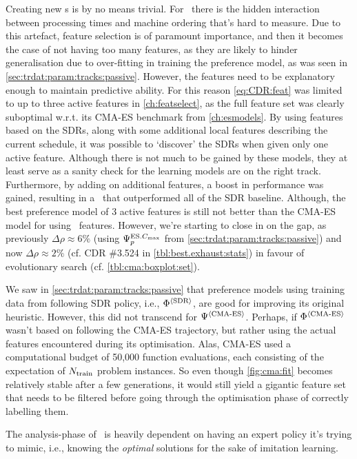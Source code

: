Creating new \dr s is by no means trivial. For \jsp\ there is 
the hidden interaction between processing times and machine ordering that's 
hard to measure.
Due to this artefact, feature selection is of paramount importance, and then it 
becomes the case of not having too many features, as they are likely to hinder 
generalisation due to over-fitting in training the preference model, as was 
seen in \cref{sec:trdat:param:tracks:passive}. 
However, the features need to be explanatory enough to maintain predictive 
ability. 
For this reason \cref{eq:CDR:feat} was limited to up to three active features 
in \cref{ch:featselect}, as the full feature set was clearly suboptimal 
w.r.t. its CMA-ES benchmark from \cref{ch:esmodels}. 
By using features based on the SDRs, along with some additional local features 
describing the current schedule, it was possible to `discover' the SDRs when 
given only one active feature. 
Although there is not much to be gained by these models, they at least serve as 
a sanity check for the learning models are on the right track. 
Furthermore, by adding on additional features, a boost in performance was 
gained, resulting in a \cdr\ that outperformed all of the SDR baseline. 
Although, the best preference model of 3 active features is still not better 
than the CMA-ES model for  using \NrFeatLocal\ features. 
However, we're starting to close in on the gap, as previously 
$\Delta\rho\approx6\%$ (using $\Psi_p^{\text{ES}.{C_{\max}}}$ from 
\cref{sec:trdat:param:tracks:passive}) and now $\Delta\rho\approx2\%$ (cf. 
CDR \#3.524 in \cref{tbl:best.exhaust:stats}) in favour of evolutionary 
search (cf. \cref{tbl:cma:boxplot:set}).



We saw in \cref{sec:trdat:param:tracks:passive} that preference models using 
training data from following SDR policy, i.e., $\Phi^{\langle \text{SDR} \rangle}$, are good for 
improving its original heuristic. However, this did not transcend for 
$\Psi^{\langle \text{CMA-ES} \rangle}$. 
Perhaps, if $\Phi^{\langle \text{CMA-ES} \rangle}$ wasn't based on following 
the CMA-ES trajectory, but rather using the actual features encountered during 
its optimisation. Alas, CMA-ES used a computational budget of 50,000 function 
evaluations, each consisting of the expectation of $N_{\text{train}}$ problem 
instances. So even though \cref{fig:cma:fit} becomes relatively stable after a 
few generations, it would still yield a gigantic feature set that needs to be 
filtered before going through the optimisation phase of correctly labelling 
them.

The analysis-phase of \Alice\ is heavily dependent on having an expert 
policy it's trying to mimic, i.e., knowing the \emph{optimal} solutions for the 
sake of imitation learning. 

